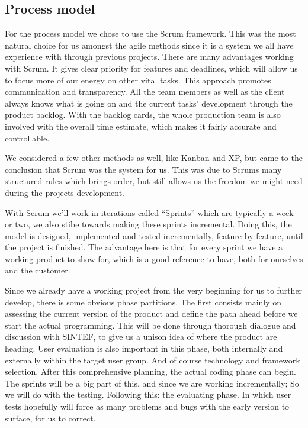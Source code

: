 	\subsection{Process model}
For the process model we chose to use the Scrum framework. This was the most natural choice for us amongst the agile methods since it is a system we all have experience with through previous projects. There are many advantages working with Scrum. It gives clear priority for features and deadlines, which will allow us to focus more of our energy on other vital tasks. This approach promotes communication and transparency. All the team members as well as the client always knows what is going on and the current tasks’ development through the product backlog. With the backlog cards, the whole production team is also involved with the overall time estimate, which makes it fairly accurate and controllable.

We considered a few other methods as well, like Kanban and XP, but came to the conclusion that Scrum was the system for us. This was due to Scrums many structured rules which brings order, but still allows us the freedom we might need during the projects development.

With Scrum we’ll work in iterations called “Sprints” which are typically a week or two, we also stibe towards making these sprints incremental. Doing this, the model is designed, implemented and tested incrementally, feature by feature, until the project is finished. The advantage here is that for every sprint we have a working product to show for, which is a good reference to have, both for ourselves and the customer. 

Since we already have a working project from the very beginning for us to further develop, there is some obvious phase partitions. The first consists mainly on assessing the current version of the product and define the path ahead before we start the actual programming. This will be done through thorough dialogue and discussion with SINTEF, to give us a unison idea of where the product are heading. User evaluation is also important in this phase, both internally and externally within the target user group. And of course technology and framework selection. After this comprehensive planning, the actual coding phase can begin. The sprints will be a big part of this, and since we are working incrementally; So we will do with the testing. Following this: the evaluating phase. In which user tests hopefully will force as many problems and bugs with the early version to surface, for us to correct.

